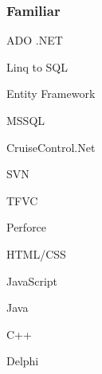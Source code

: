 \documentclass[a4paper,11pt]{article}
\begin{document}
\begin{minipage}[t]{0.34\textwidth}
    \subsubsection*{Familiar}
	\begin{inparaitem}
      \item ADO .NET 
	  \item Linq to SQL
	  \item Entity Framework
	  \item MSSQL
	  \item CruiseControl.Net
	  \item SVN
	  \item TFVC
	  \item Perforce
	  \item HTML/CSS
	  \item JavaScript
	  \item Java
	  \item C++
	  \item Delphi
	\end{inparaitem}
  \end{minipage}
  \hfil
\end{document}
